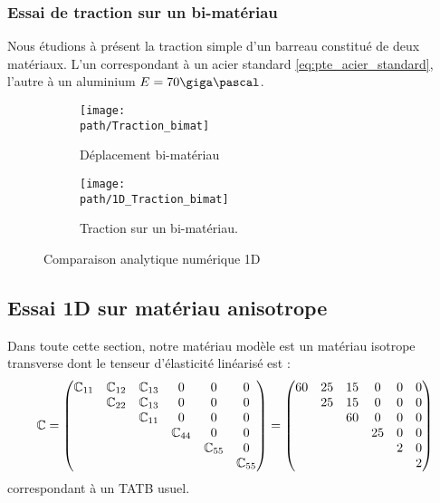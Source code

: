 \documentclass[10pt]{book}
\def\path{./fig}
\begin{document}
\subsubsection{Essai de traction sur un bi-matériau}
Nous étudions à présent la traction simple d'un barreau constitué de deux matériaux. L'un correspondant à un acier standard \eqref{eq:pte_acier_standard}, l'autre à un aluminium $E = 70\giga\pascal$.
\begin{figure}[h!]
\begin{subfigure}[b]{0.49\textwidth}
\centering \texttt{[image: \\path/Traction\_bimat]}
\caption{Déplacement bi-matériau}
\label{fig:compa_analytique_compr_sph1D}
\end{subfigure}\hfill
\begin{subfigure}[b]{0.49\textwidth}
\centering \texttt{[image: \\path/1D\_Traction\_bimat]}
\caption{Traction sur un bi-matériau.}
\label{fig:compa_analytique_num_bimat_traction}
\end{subfigure}
\caption{Comparaison analytique numérique 1D}
\end{figure}
\subsection{Essai 1D sur matériau anisotrope}
Dans toute cette section, notre matériau modèle est un matériau isotrope transverse dont le tenseur d'élasticité linéarisé est :
$$\mathbb{C} = \begin{pmatrix}
\mathbb{C}_{11} & \mathbb{C}_{12} & \mathbb{C}_{13} & 0 & 0 & 0\\  
& \mathbb{C}_{22} & \mathbb{C}_{13} & 0 & 0 & 0\\
& & \mathbb{C}_{11} & 0 & 0 & 0\\
& & & \mathbb{C}_{44} & 0 & 0\\
& & & & \mathbb{C}_{55} & 0\\
& & & & & \mathbb{C}_{55}\\
\end{pmatrix} = \begin{pmatrix}
60 & 25 & 15 & 0 & 0 & 0\\ 
& 25 & 15 & 0 & 0 & 0\\ 
& & 60 & 0 & 0 & 0\\  
& & & 25 & 0 & 0\\
& & & & 2 & 0\\
& & & & & 2\\
\end{pmatrix}$$
correspondant à un TATB usuel.
\newcommand{\SPKo}{\bar{\SPK}_{0}}
\end{document}
